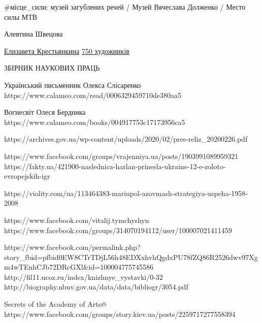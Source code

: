 
#місце_сили: музей загублених речей / Музей Вячеслава Долженко / Место силы МТВ 

Алевтина Швецова

\href{https://www.facebook.com/lizakrestiankina}{Елизавета Крестьянкина}
\href{https://www.facebook.com/groups/1013559558679300}{750 художників}

ЗБІРНИК НАУКОВИХ ПРАЦЬ

Український письменник Олекса Слісаренко
https://www.calameo.com/read/0006329459710de380aa5

Вогнесвіт Олеся Бердника
https://www.calameo.com/books/004917753c17173956ca5

https://archives.gov.ua/wp-content/uploads/2020/02/pres-reliz_20200226.pdf

https://www.facebook.com/groups/vrajenniya.ua/posts/1903991089959321
https://fakty.ua/421900-naslednica-harlan-prinesla-ukraine-12-e-zoloto-evropejskih-igr

https://violity.com/ua/113464383-mariupol-azovmash-strategiya-uspeha-1958-2008

https://www.facebook.com/vitalij.tymchyshyn
https://www.facebook.com/groups/314070194112/user/100007021411459

https://www.facebook.com/permalink.php?story_fbid=pfbid0EW8CTrTDjL56h48EDXxhvhQgdxPU78fZQ86R2526dwv97Xgm4wTEnhCJb72DRcGXl&id=100004775745586
http://fil11.ucoz.ru/index/knizhnye_vystavki/0-32
http://biography.nbuv.gov.ua/data/data/bibliogr/3054.pdf

Secrets of the Academy of Arts🔥
https://www.facebook.com/groups/story.kiev.ua/posts/2259717277558394


